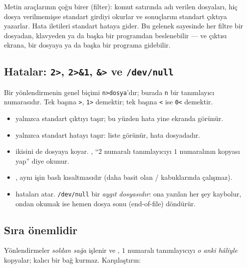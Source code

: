\begin{keyidea}
Metin araçlarının çoğu birer  (filter): komut satırında adı verilen dosyaları, hiç dosya verilmemişse standart girdiyi okurlar ve sonuçlarını standart çıktıya yazarlar. Hata iletileri standart hataya gider. Bu gelenek sayesinde her filtre bir dosyadan, klavyeden ya da başka bir programdan beslenebilir --- ve çıktısı ekrana, bir dosyaya ya da başka bir programa gidebilir.
\end{keyidea}

\subsection{Hatalar: \texttt{2>}, \texttt{2>\&1}, \texttt{\&>} ve \texttt{/dev/null}}

Bir yönlendirmenin genel biçimi \texttt{n>dosya}'dır; burada \texttt{n} bir tanımlayıcı numarasıdır. Tek başına \texttt{>}, \texttt{1>} demektir; tek başına \texttt{<} ise \texttt{0<} demektir.




\begin{itemize}
  \item {} yalnızca standart çıktıyı taşır; bu yüzden hata yine ekranda görünür.
  \item {} yalnızca standart hatayı taşır: liste görünür, hata dosyadadır.
  \item {} ikisini de dosyaya koyar. , ``$2$ numaralı tanımlayıcıyı $1$ numaralının kopyası yap'' diye okunur.
  \item {}, aynı işin bash kısaltmasıdır (daha basit olan / kabuklarında çalışmaz).
  \item {} hataları atar. \texttt{/dev/null} bir \emph{aygıt dosyasıdır}: ona yazılan her şey kaybolur, ondan okumak ise hemen dosya sonu (end-of-file) döndürür.
\end{itemize}

\subsection{Sıra önemlidir}

Yönlendirmeler \emph{soldan sağa} işlenir ve , $1$ numaralı tanımlayıcıyı \emph{o anki hâliyle} kopyalar; kalıcı bir bağ kurmaz. Karşılaştırın:

